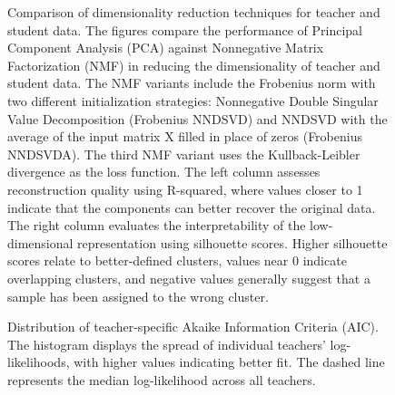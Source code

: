\documentclass[
  number,
  preprint,
  3p,
  onecolumn]{elsarticle}
\begin{document}
\newpage{}

\begin{figure}

\begin{minipage}{\linewidth}



\end{minipage}%
\newline
\begin{minipage}{\linewidth}



\end{minipage}%

\caption{\label{fig-nmf-pca-comparison}Comparison of dimensionality
reduction techniques for teacher and student data. The figures compare
the performance of Principal Component Analysis (PCA) against
Nonnegative Matrix Factorization (NMF) in reducing the dimensionality of
teacher and student data. The NMF variants include the Frobenius norm
with two different initialization strategies: Nonnegative Double
Singular Value Decomposition (Frobenius NNDSVD) and NNDSVD with the
average of the input matrix X filled in place of zeros (Frobenius
NNDSVDA). The third NMF variant uses the Kullback-Leibler divergence as
the loss function. The left column assesses reconstruction quality using
R-squared, where values closer to 1 indicate that the components can
better recover the original data. The right column evaluates the
interpretability of the low-dimensional representation using silhouette
scores. Higher silhouette scores relate to better-defined clusters,
values near 0 indicate overlapping clusters, and negative values
generally suggest that a sample has been assigned to the wrong cluster.}

\end{figure}%

\newpage{}

\begin{figure}


\caption{\label{fig-loglik-histogram}Distribution of teacher-specific
Akaike Information Criteria (AIC). The histogram displays the spread of
individual teachers' log-likelihoods, with higher values indicating
better fit. The dashed line represents the median log-likelihood across
all teachers.}

\end{figure}%
\end{document}
